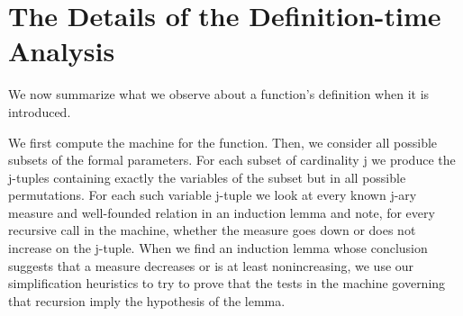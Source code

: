 \documentclass[10pt]{book}
\begin{document}
\section{The Details of the Definition-time Analysis}
We now summarize what we observe about a function's definition
when it is introduced.

We first compute the machine for the function.
Then, we consider all possible subsets of the formal parameters.
For each subset of cardinality j we produce the j-tuples containing exactly the variables of the subset
but in all possible permutations.
For each such variable j-tuple we
look at every known j-ary measure and well-founded relation in
an induction lemma and note, for every recursive call in the machine, whether the measure goes down or does
not increase on the j-tuple.
When we find an induction lemma whose conclusion
suggests that a measure decreases or is at least nonincreasing,
we use our simplification heuristics to try to prove that the tests
in the machine governing that recursion imply the hypothesis of the
lemma.
\end{document}
